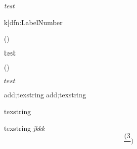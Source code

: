 \begin{itemize}
\end{itemize}

\textit{test}

\begin{dfn}k]{dfn:Label}{Number}
\end{dfn}

()

$\mathbb{test}$

()


\texorpdfstring{$test$}{word}

add;texstring
add;texstring





texstring

texstring
\textit{jkkk}
\[\frac{(3}{})\]

